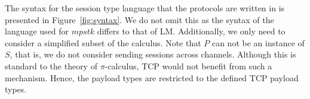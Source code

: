 The syntax for the session type language that the protocols are written in is presented in Figure~\ref{fig:syntax}.
We do not omit this as the syntax of the language used for \ensuremath{mpstk} differs to that of LM.
Additionally, we only need to consider a simplified subset of the calculus.
Note that \ensuremath{P} can not be an instance of \ensuremath{S}, that is, we do not consider sending sessions across channels.
Although this is standard to the theory of \ensuremath{\pi}-calculus, TCP would not benefit from such a mechanism.
Hence, the payload types are restricted to the defined TCP payload types.
